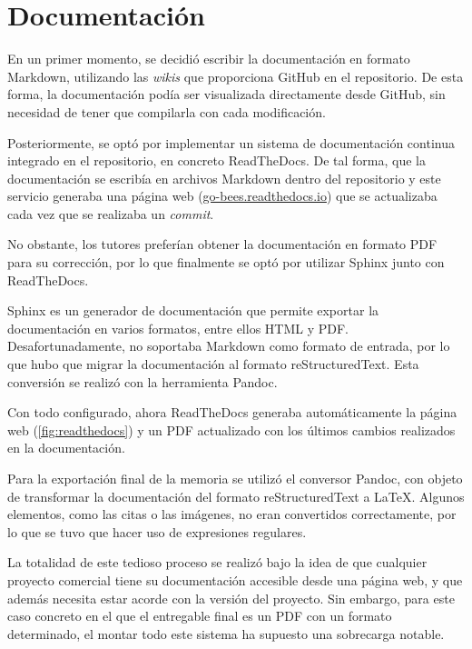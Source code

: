 \section{Documentación}\label{aspectos-documentacion}

En un primer momento, se decidió escribir la documentación en formato
Markdown, utilizando las \emph{wikis} que proporciona GitHub en el
repositorio. De esta forma, la documentación podía ser visualizada
directamente desde GitHub, sin necesidad de tener que compilarla con
cada modificación.

Posteriormente, se optó por implementar un sistema de documentación
continua integrado en el repositorio, en concreto ReadTheDocs. De tal
forma, que la documentación se escribía en archivos Markdown dentro del
repositorio y este servicio generaba una página web
(\href{http://go-bees.readthedocs.io/}{go-bees.readthedocs.io}) que se
actualizaba cada vez que se realizaba un \emph{commit}.

No obstante, los tutores preferían obtener la documentación en formato
PDF para su corrección, por lo que finalmente se optó por utilizar
Sphinx junto con ReadTheDocs.

Sphinx es un generador de documentación que permite exportar la
documentación en varios formatos, entre ellos HTML y PDF.
Desafortunadamente, no soportaba Markdown como formato de entrada, por
lo que hubo que migrar la documentación al formato reStructuredText.
Esta conversión se realizó con la herramienta Pandoc.

Con todo configurado, ahora ReadTheDocs generaba automáticamente la
página web (\ref{fig:readthedocs}) y un PDF actualizado con los 
últimos cambios realizados en la documentación.


Para la exportación final de la memoria se utilizó el conversor Pandoc,
con objeto de transformar la documentación del formato reStructuredText
a \LaTeX. Algunos elementos, como las citas o las imágenes, no eran
convertidos correctamente, por lo que se tuvo que hacer uso de
expresiones regulares.

La totalidad de este tedioso proceso se realizó bajo la idea de que
cualquier proyecto comercial tiene su documentación accesible desde una
página web, y que además necesita estar acorde con la versión del
proyecto. Sin embargo, para este caso concreto en el que el entregable
final es un PDF con un formato determinado, el montar todo este sistema
ha supuesto una sobrecarga notable.

